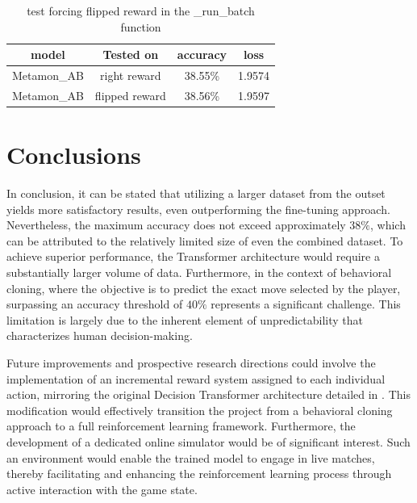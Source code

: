 \documentclass{article}
\begin{document}
\begin{table}[H]
    \centering
    \begin{tabular}{c|c|c|c}
         \hline 
         model &Tested on & accuracy & loss \\
        \hline 
         Metamon\_AB & right reward & 38.55\% & 1.9574\\
         \hline 
         Metamon\_AB & flipped reward & 38.56\% & 1.9597\\
         \hline 
    \end{tabular}
    \caption{test forcing flipped reward in the \_run\_batch function}
    \label{t4}
\end{table}{}



\section{Conclusions}
In conclusion, it can be stated that utilizing a larger dataset from the outset yields more satisfactory results, even outperforming the fine-tuning approach. Nevertheless, the maximum accuracy does not exceed approximately $38\%$, which can be attributed to the relatively limited size of even the combined dataset. To achieve superior performance, the Transformer architecture would require a substantially larger volume of data. Furthermore, in the context of behavioral cloning, where the objective is to predict the exact move selected by the player, surpassing an accuracy threshold of $40\%$ represents a significant challenge. This limitation is largely due to the inherent element of unpredictability that characterizes human decision-making. 

Future improvements and prospective research directions could involve the implementation of an incremental reward system assigned to each individual action, mirroring the original Decision Transformer architecture detailed in \cite{chen2021decision}. This modification would effectively transition the project from a behavioral cloning approach to a full reinforcement learning framework. Furthermore, the development of a dedicated online simulator would be of significant interest. Such an environment would enable the trained model to engage in live matches, thereby facilitating and enhancing the reinforcement learning process through active interaction with the game state.

\newpage
\nocite{*}
 




\end{document}
